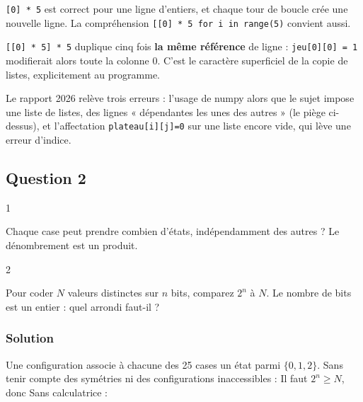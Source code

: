 \documentclass[11pt,a4paper]{article}
\newcommand{\equationajustee}[1]{%
  \sbox{\boiteequation}{$\displaystyle #1$}%
  \ifdim\wd\boiteequation>\linewidth
    \[\resizebox{\linewidth}{!}{\usebox{\boiteequation}}\]%
  \else
    \[#1\]%
  \fi}
\begin{document}
\texttt{{[}0{]}\ *\ 5} est correct pour une ligne d'entiers, et chaque tour de boucle crée une nouvelle ligne. La compréhension \texttt{{[}{[}0{]}\allowbreak{}\ *\ 5\ for\ i\ in\ range(\allowbreak{}5)\allowbreak{}{]}\allowbreak{}} convient aussi.

\begin{piege}

\texttt{{[}{[}0{]}\ *\ 5{]}\ *\ 5} duplique cinq fois \textbf{la même référence} de ligne : \texttt{jeu{[}0{]}{[}0{]}\ =\ 1} modifierait alors toute la colonne 0. C'est le caractère superficiel de la copie de listes, explicitement au programme.

\end{piege}

\begin{jury}

Le rapport 2026 relève trois erreurs : l'usage de numpy alors que le sujet impose une liste de listes, des lignes « dépendantes les unes des autres » (le piège ci-dessus), et l'affectation \texttt{plateau{[}i{]}{[}j{]}=0} sur une liste encore vide, qui lève une erreur d'indice.

\end{jury}

\hypertarget{question-2}{%
\subsection{Question 2}\label{question-2}}

\begin{indication}{1}

Chaque case peut prendre combien d'états, indépendamment des autres ? Le dénombrement est un produit.

\end{indication}

\begin{indication}{2}

Pour coder \(N\) valeurs distinctes sur \(n\) bits, comparez \(2^n\) à \(N\). Le nombre de bits est un entier : quel arrondi faut-il ?

\end{indication}

\hypertarget{solution-1}{%
\subsubsection{Solution}\label{solution-1}}

Une configuration associe à chacune des 25 cases un état parmi \(\{0,1,2\}\). Sans tenir compte des symétries ni des configurations inaccessibles :
\equationajustee{\boxed{N\le3^{25}\approx8{,}5\cdot10^{11}.}}
Il faut \(2^n\ge N\), donc
\equationajustee{\begin{aligned}
n&=\left\lceil\log_2\left(3^{25}\right)\right\rceil\\
&=\left\lceil25\log_2 3\right\rceil\\
&=\left\lceil 25\,\frac{\ln3}{\ln2}\right\rceil\\
&=\boxed{40.}
\end{aligned}}
Sans calculatrice :
\end{document}
